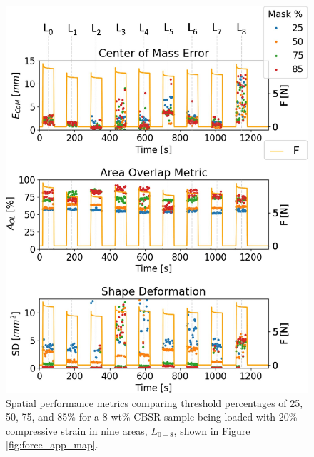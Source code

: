 \begin{figure}[H]
    \centering
    \includegraphics[width=0.8\linewidth]{Figures/CBSR_8p_9push_20strain_60s_4_metrics_thresh_masks_v2_numbd_F.png}
    \caption{Spatial performance metrics comparing threshold percentages of 25, 50, 75, and 85\% for a 8 wt\% CBSR sample being loaded with 20\% compressive strain in nine areas, $L_{0-8}$, shown in Figure \ref{fig:force_app_map}.} %
    \label{fig:recon_perform_8p}
\end{figure}


